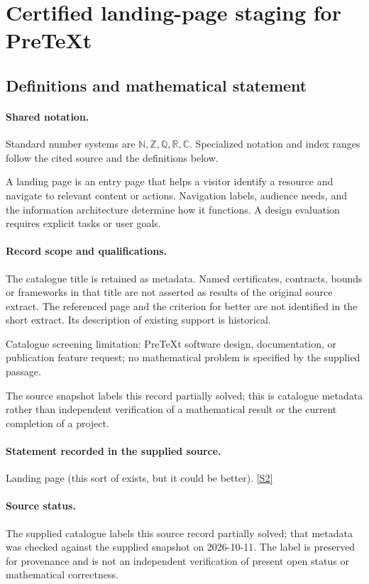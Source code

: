 \documentclass[11pt]{article}
\newcommand{\sref}[2]{\hyperlink{source:#1:#2}{[S#2]}}
\begin{document}
\section{Certified landing-page staging for PreTeXt}\label{statement}

\subsection{Definitions and mathematical statement}

\paragraph{Shared notation.}Standard number systems are $\mathbb N,\mathbb Z,\mathbb Q,\mathbb R,\mathbb C$. Specialized notation and index ranges follow the cited source and the definitions below.


A landing page is an entry page that helps a visitor identify a resource and navigate to relevant content or actions. Navigation labels, audience needs, and the information architecture determine how it functions. A design evaluation requires explicit tasks or user goals.
\paragraph{Record scope and qualifications.}
The catalogue title is retained as metadata. Named certificates, contracts, bounds or frameworks in that title are not asserted as results of the original source extract.
The referenced page and the criterion for better are not identified in the short extract. Its description of existing support is historical.

Catalogue screening limitation: PreTeXt software design, documentation, or publication feature request; no mathematical problem is specified by the supplied passage.

The source snapshot labels this record partially solved; this is catalogue metadata rather than independent verification of a mathematical result or the current completion of a project.
\paragraph{Statement recorded in the supplied source.}
Landing page (this sort of exists, but it could be better). \sref{statement}{2}
\paragraph{Source status.}
The supplied catalogue labels this source record partially solved; that metadata was checked against the supplied snapshot on 2026-10-11. The label is preserved for provenance and is not an independent verification of present open status or mathematical correctness.
\end{document}
